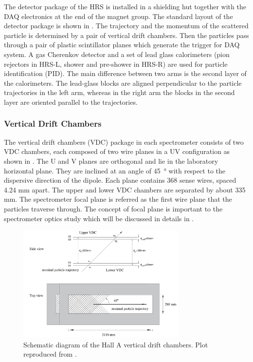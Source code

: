 The detector package of the HRS is installed in a shielding hut together with the DAQ electronics at the end of the magnet group. The standard layout of the detector package is shown in . The trajectory and the momentum of the scattered particle is determined by a pair of vertical drift chambers. Then the particles pass through a pair of plastic scintillator planes which generate the trigger for DAQ system. A gas Cherenkov detector and a set of lead glass calorimeters (pion rejectors in HRS-L, shower and pre-shower in HRS-R) are used for particle identification (PID). The main difference between two arms is the second layer of the calorimeters. The lead-glass blocks are aligned perpendicular to the particle trajectories in the left arm, whereas in the right arm the blocks in the second layer are oriented parallel to the trajectories.

\subsubsection{Vertical Drift Chambers}

The vertical drift chambers (VDC) package in each spectrometer consists of two VDC chambers, each composed of two wire planes in a UV configuration \cite{Fissum2001} as shown in . The U and V planes are orthogonal and lie in the laboratory horizontal plane. They are inclined at an angle of \SI{45}{\degree} with respect to the dispersive direction of the dipole. Each plane contains 368 sense wires, spaced 4.24 mm apart. The upper and lower VDC chambers are separated by about 335 mm. The spectrometer focal plane is referred as the first wire plane that the particles traverse through. The concept of focal plane is important to the spectrometer optics study which will be discussed in details in .

\begin{figure}[b!]
  \centering
  \includegraphics[width=0.75\textwidth]{figs/VDC.png}
  \caption[Schematic diagram of the Hall A vertical drift chambers.]{Schematic diagram of the Hall A vertical drift chambers. Plot reproduced from \cite{Alcorn2004}. \label{C5S4SS2F2}}
\end{figure}

